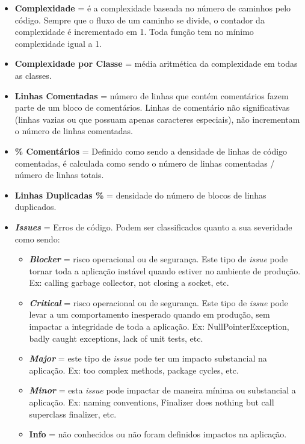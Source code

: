 \begin{itemize}
\item\textbf{Complexidade} = é a complexidade baseada no número de caminhos pelo código. Sempre que o fluxo de um caminho se divide, o contador da complexidade é incrementado em 1. Toda função tem no mínimo complexidade igual a 1.
\item\textbf{Complexidade por Classe} = média aritmética da complexidade em todas as classes.
\item\textbf{Linhas Comentadas} = número de linhas que contém comentários fazem parte de um bloco de comentários. Linhas de comentário não significativas (linhas vazias ou que possuam apenas caracteres especiais), não incrementam o número de linhas comentadas.
\item\textbf{\% Comentários} = Definido como sendo a densidade de linhas de código comentadas, é calculada como sendo o número de linhas comentadas / número de linhas totais.


\item\textbf{Linhas Duplicadas \%} = densidade do número de blocos de linhas duplicados.


\item\textbf{\textit{Issues}} = Erros de código. Podem ser classificados quanto a sua severidade como sendo:
\begin{itemize}
\item\textbf{\textit{Blocker}} = risco operacional ou de segurança. Este tipo de \textit{issue} pode tornar toda a aplicação instável quando estiver no ambiente de produção. Ex: calling garbage collector, not closing a socket, etc.
\item\textbf{\textit{Critical}} = risco operacional ou de segurança. Este tipo de \textit{issue} pode levar a um comportamento inesperado quando em produção, sem impactar a integridade de toda a aplicação. Ex: NullPointerException, badly caught exceptions, lack of unit tests, etc.
\item\textbf{\textit{Major}} = este tipo de \textit{issue} pode ter um impacto substancial na aplicação. Ex: too complex methods, package cycles, etc.
\item\textbf{\textit{Minor}} = esta \textit{issue} pode impactar de maneira mínima ou substancial a aplicação. Ex: naming conventions, Finalizer does nothing but call superclass finalizer, etc.
\item\textbf{Info} = não conhecidos ou não foram definidos impactos na aplicação.
\end{itemize}


\end{itemize}
